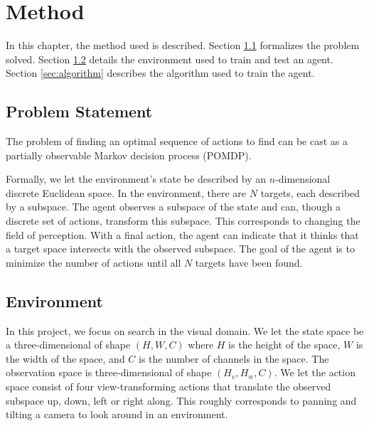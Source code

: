 \chapter{Method}
\label{cha:method}

In this chapter, the method used is described. Section \ref{sec:problem} formalizes the problem solved. Section \ref{sec:environment} details the environment used to train and test an agent. Section \ref{sec:algorithm} describes the algorithm used to train the agent.

\section{Problem Statement}
\label{sec:problem}


The problem of finding an optimal sequence of actions to find can be cast as a partially observable Markov decision process (POMDP). 

Formally, we let the environment's state be described by an \(n\)-dimensional discrete Euclidean space. In the environment, there are \(N\) targets, each described by a subspace. The agent observes a subspace of the state and can, though a discrete set of actions, transform this subspace. This corresponds to changing the field of perception. With a final action, the agent can indicate that it thinks that a target space intersects with the observed subspace. The goal of the agent is to minimize the number of actions until all \(N\) targets have been found.


\section{Environment}
\label{sec:environment}

In this project, we focus on search in the visual domain. We let the state space be a three-dimensional of shape \((H, W, C)\) where \(H\) is the height of the space, \(W\) is the width of the space, and \(C\) is the number of channels in the space. The observation space is three-dimensional of shape \((H_v, H_w, C)\). We let the action space consist of four view-transforming actions that translate the observed subspace up, down, left or right along. This roughly corresponds to panning and tilting a camera to look around in an environment.

